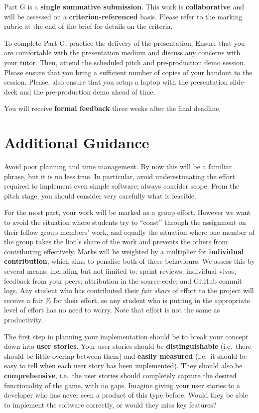 \documentclass{../fal_assignment}
\begin{document}
Part G is a \textbf{single summative submission}. This work is \textbf{collaborative} and will be assessed on a \textbf{criterion-referenced} basis. Please refer to the marking rubric at the end of the brief for details on the criteria.

To complete Part G, practice the delivery of the presentation. Ensure that you are comfortable with the presentation medium and discuss any concerns with your tutor. Then, attend the scheduled pitch and pre-production demo session. Please ensure that you bring a sufficient number of copies of your handout to the session. Please, also ensure that you setup a laptop with the presentation slide-deck and the pre-production demo ahead of time.

You will receive \textbf{formal feedback} three weeks after the final deadline.

\section*{Additional Guidance}

Avoid poor planning and time management. By now this will be a familiar phrase, but it is no less true.
In particular, avoid underestimating the effort required to implement even simple software; always consider scope.
From the pitch stage, you should consider very carefully what is feasible.

For the most part, your work will be marked as a group effort.
However we want to avoid the situation where students try to ``coast'' through the assignment
on their fellow group members' work,
and equally the situation where one member of the group takes the lion's share of the work
and prevents the others from contributing effectively.
Marks will be weighted by a multiplier for \textbf{individual contribution},
which aims to penalise both of these behaviours.
We assess this by several means, including but not limited to: sprint reviews; individual vivas; feedback from your peers;
attribution in the source code; and GitHub commit logs.
Any student who has contributed their \textit{fair share} of effort to the project will receive a fair \% for their effort,
so any student who is putting in the appropriate level of effort has no need to worry.
Note that effort is not the same as productivity.

The first step in planning your implementation should be to break your concept down into \textbf{user stories}. 
Your user stories should be \textbf{distinguishable} (i.e.\ there should be little overlap between them)
and \textbf{easily measured} (i.e.\ it should be easy to tell when each user story has been implemented).
They should also be \textbf{comprehensive}, i.e.\ the user stories should completely capture the
desired functionality of the game, with no gaps.
Imagine giving your user stories to a developer who has never seen a product of this type before.
Would they be able to implement the software correctly, or would they miss key features?
\end{document}

